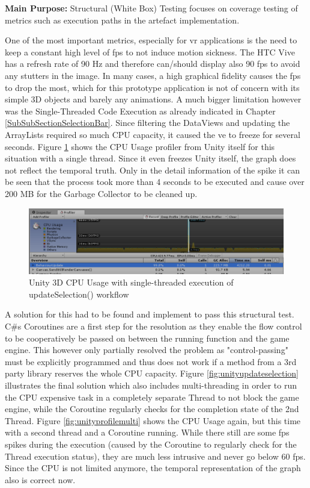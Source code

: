 \textbf{Main Purpose:} Structural (White Box) Testing focuses on coverage testing of metrics such as execution paths in the artefact implementation.

One of the most important metrics, especially for \gls{vr} applications is the need to keep a constant high level of \gls{fps} to not induce motion sickness. The HTC Vive has a refresh rate of 90 Hz and therefore can/should display also 90 \gls{fps} to avoid any stutters in the image. In many cases, a high graphical fidelity causes the \gls{fps} to drop the most, which for this prototype application is not of concern with its simple 3D objects and barely any animations. A much bigger limitation however was the Single-Threaded Code Execution as already indicated in Chapter \ref{SubSubSectionSelectionBar}. Since filtering the DataViews and updating the ArrayLists required so much CPU capacity, it caused the \gls{ve} to freeze for several seconds. Figure \ref{fig:unityprofilesingle} shows the CPU Usage profiler from Unity itself for this situation with a single thread. Since it even freezes Unity itself, the graph does not reflect the temporal truth. Only in the detail information of the spike it can be seen that the process took more than 4 seconds to be executed and cause over 200 MB for the Garbage Collector to be cleaned up.
\begin{figure}[h]
	\begin{center}
		\includegraphics[width=14cm]{03_Figures/08_Development/CPU_Usage_Singlethreaded.png}
		\caption{Unity 3D CPU Usage with single-threaded execution of updateSelection() workflow}
		\label{fig:unityprofilesingle}
	\end{center}
\end{figure}
A solution for this had to be found and implement to pass this structural test. C\#s Coroutines are a first step for the resolution as they enable the flow control to be cooperatively be passed on between the running function and the game engine. This however only partially resolved the problem as "control-passing" must be explicitly programmed and thus does not work if a method from a 3rd party library reserves the whole CPU capacity. Figure \ref{fig:unityupdateselection} illustrates the final solution which also includes multi-threading in order to run the CPU expensive task in a completely separate Thread to not block the game engine, while the Coroutine regularly checks for the completion state of the 2nd Thread. Figure \ref{fig:unityprofilemulti} shows the CPU Usage again, but this time with a second thread and a Coroutine running. While there still are some \gls{fps} spikes during the execution (caused by the Coroutine to regularly check for the Thread execution status), they are much less intrusive and never go below 60 \gls{fps}. Since the CPU is not limited anymore, the temporal representation of the graph also is correct now.
